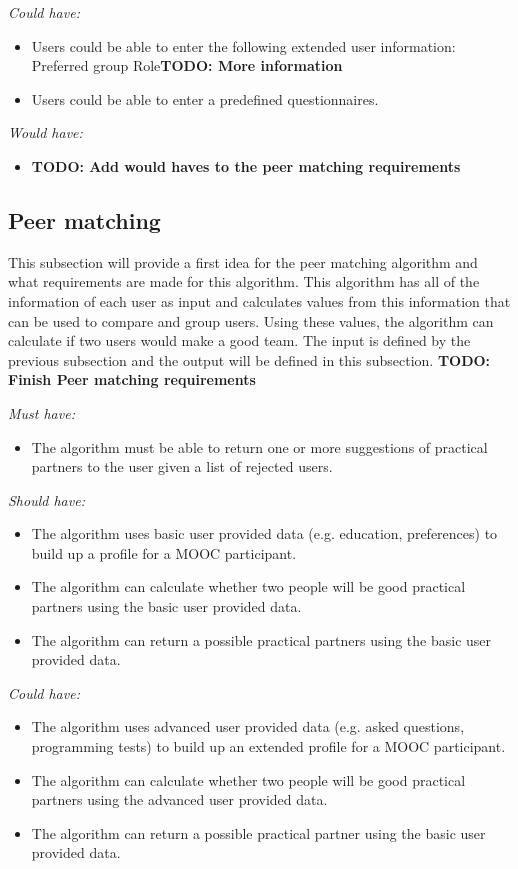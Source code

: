 \documentclass[]{article}
\newcommand{\TODO}[1]{{\color{red}\textbf{TODO: #1}}}
\newcommand{\reqr}[1]{{\noindent\emph{#1:}}}
\begin{document}
\reqr{Could have}
\begin{itemize}
\item Users could be able to enter the following extended user information: Preferred group Role\TODO{More information}
\item Users could be able to enter a predefined questionnaires.
\end{itemize}

\reqr{Would have}
\begin{itemize}
\item \TODO{Add would haves to the peer matching requirements}
\end{itemize}

\subsection{Peer matching}
This subsection will provide a first idea for the peer matching algorithm and what requirements are made for this algorithm.
This algorithm has all of the information of each user as input and calculates values from this information that can be used to compare and group users.
Using these values, the algorithm can calculate if two users would make a good team.
The input is defined by the previous subsection and the output will be defined in this subsection.
\TODO{Finish Peer matching requirements}

\reqr{Must have}
\begin{itemize}
\item The algorithm must be able to return one or more suggestions of practical partners to the user given a list of rejected users.
\end{itemize}

\reqr{Should have}
\begin{itemize}
\item The algorithm uses basic user provided data (e.g. education, preferences) to build up a profile for a MOOC participant.
\item The algorithm can calculate whether two people will be good practical partners using the basic user provided data.
\item The algorithm can return a possible practical partners using the basic user provided data.
\end{itemize}

\reqr{Could have}
\begin{itemize}
\item The algorithm uses advanced user provided data (e.g. asked questions, programming tests) to build up an extended profile for a MOOC participant.
\item The algorithm can calculate whether two people will be good practical partners using the advanced user provided data.
\item The algorithm can return a possible practical partner using the basic user provided data.
\end{itemize}
\end{document}
